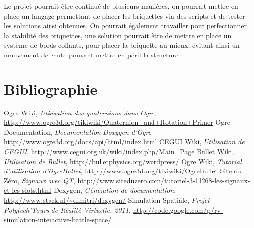 \documentclass[frenchb,twoside]{EPURapport}
\begin{document}
    Le projet pourrait être continué de plusieurs manières, on pourrait mettre
    en place un langage permettant de placer les briquettes via des scripts et
    de tester les solutions ainsi obtenues. On pourrait également travailler pour
    perfectionner la stabilité des briquettes, une solution pourrait être de
    mettre en place un système de bords collants, pour placer la briquette au
    mieux, évitant ainsi un mouvement de chute pouvant mettre en péril la
    structure.



\chapter{Bibliographie}

\begin{bibliographie}	
	 Ogre Wiki, \textit{Utilisation des quaternions dans Ogre}, \url{http://www.ogre3d.org/tikiwiki/Quaternion+and+Rotation+Primer}
	 Ogre Documentation, \textit{Documentation Doxygen d'Ogre}, \url{http://www.ogre3d.org/docs/api/html/index.html}
	 CEGUI Wiki, \textit{Utilisation de CEGUI}, \url{http://www.cegui.org.uk/wiki/index.php/Main_Page}
	 Bullet Wiki, \textit{Utilisation de Bullet}, \url{http://bulletphysics.org/wordpress/}
	 Ogre Wiki, \textit{Tutorial d'utilisation d'OgreBullet}, \url{http://www.ogre3d.org/tikiwiki/OgreBullet}
	 Site du Zéro, \textit{Signaux avec QT}, \url{http://www.siteduzero.com/tutoriel-3-11268-les-signaux-et-les-slots.html}
	 Doxygen, \textit{Génération de documentation}, \url{http://www.stack.nl/~dimitri/doxygen/}
	 Simulation Spatiale, \textit{Projet Polytech'Tours de Réalité Virtuelle, 2011}, \url{http://code.google.com/p/rv-simulation-interactive-battle-space/}
	\end{bibliographie}	
\end{document}
